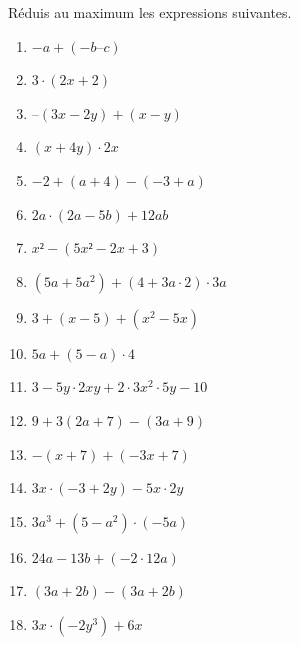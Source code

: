 %
%
	Réduis au maximum les expressions suivantes.
	\begin{enumerate}[cols=2]
		\item \(-a + (-b – c )\)
		\item \(3\cdot (2x + 2 )\)
		\item \( – (3x - 2y) +(x - y)\)
		\item \((x + 4y)\cdot 2x\)
		\item \(-2 + (a + 4) - (-3 + a)\)
		\item \(2a \cdot (2a-5b)+12ab\)
		\item \(x²-(5x² -2x + 3)\)
		\item \((5a +5a^2)+(4 + 3a\cdot 2)\cdot 3a\)
		\item \(3+(x-5)+(x^2-5x) \)
		\item \(5a+(5-a)\cdot 4\)
		\item \(3 - 5y \cdot 2xy + 2\cdot 3x^2\cdot 5y - 10\)
		\item \(9 + 3(2a + 7) - (3a + 9)\)
		\item \(-(x+7) + (-3x + 7)\)
		\item \(3x \cdot (-3 + 2y) - 5x \cdot 2y\)
		\item \(3a^3 + (5-a^2)\cdot (-5a)\)
		\item \(24a - 13b + (-2 \cdot 12a)\)
		\item \((3a + 2b) - (3a + 2b)\)
		\item \(3x \cdot (-2y^3) + 6x\)
	\end{enumerate}
